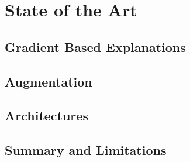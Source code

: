 \chapter{State of the Art}
\section{Gradient Based Explanations}
\section{Augmentation}
\section{Architectures}
\section{Summary and Limitations}